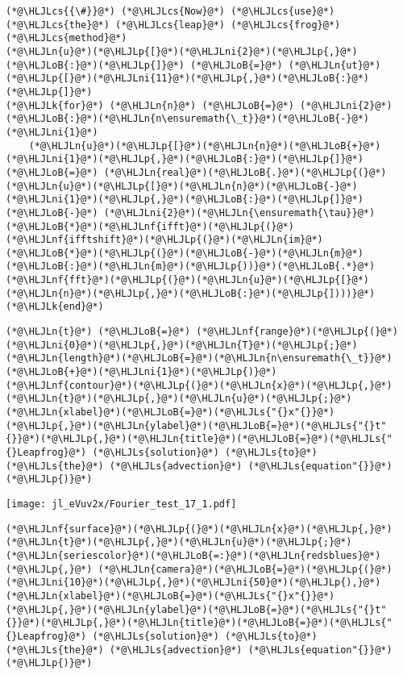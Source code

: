 \documentclass[12pt,a4paper]{article}
\newcommand{\HLJLk}[1]{\textcolor[RGB]{148,91,176}{\textbf{#1}}}
\newcommand{\HLJLn}[1]{#1}
\newcommand{\HLJLnf}[1]{\textcolor[RGB]{66,102,213}{#1}}
\newcommand{\HLJLs}[1]{\textcolor[RGB]{201,61,57}{#1}}
\newcommand{\HLJLni}[1]{\textcolor[RGB]{59,151,46}{#1}}
\newcommand{\HLJLoB}[1]{\textcolor[RGB]{102,102,102}{\textbf{#1}}}
\newcommand{\HLJLp}[1]{#1}
\newcommand{\HLJLcs}[1]{\textcolor[RGB]{153,153,119}{\textit{#1}}}
\begin{document}
\begin{lstlisting}
(*@\HLJLcs{{\#}}@*) (*@\HLJLcs{Now}@*) (*@\HLJLcs{use}@*) (*@\HLJLcs{the}@*) (*@\HLJLcs{leap}@*) (*@\HLJLcs{frog}@*) (*@\HLJLcs{method}@*)
(*@\HLJLn{u}@*)(*@\HLJLp{[}@*)(*@\HLJLni{2}@*)(*@\HLJLp{,}@*)(*@\HLJLoB{:}@*)(*@\HLJLp{]}@*) (*@\HLJLoB{=}@*) (*@\HLJLn{ut}@*)(*@\HLJLp{[}@*)(*@\HLJLni{11}@*)(*@\HLJLp{,}@*)(*@\HLJLoB{:}@*)(*@\HLJLp{]}@*)
(*@\HLJLk{for}@*) (*@\HLJLn{n}@*) (*@\HLJLoB{=}@*) (*@\HLJLni{2}@*)(*@\HLJLoB{:}@*)(*@\HLJLn{n\ensuremath{\_t}}@*)(*@\HLJLoB{-}@*)(*@\HLJLni{1}@*)
    (*@\HLJLn{u}@*)(*@\HLJLp{[}@*)(*@\HLJLn{n}@*)(*@\HLJLoB{+}@*)(*@\HLJLni{1}@*)(*@\HLJLp{,}@*)(*@\HLJLoB{:}@*)(*@\HLJLp{]}@*) (*@\HLJLoB{=}@*) (*@\HLJLn{real}@*)(*@\HLJLoB{.}@*)(*@\HLJLp{(}@*)(*@\HLJLn{u}@*)(*@\HLJLp{[}@*)(*@\HLJLn{n}@*)(*@\HLJLoB{-}@*)(*@\HLJLni{1}@*)(*@\HLJLp{,}@*)(*@\HLJLoB{:}@*)(*@\HLJLp{]}@*) (*@\HLJLoB{-}@*) (*@\HLJLni{2}@*)(*@\HLJLn{\ensuremath{\tau}}@*)(*@\HLJLoB{*}@*)(*@\HLJLnf{ifft}@*)(*@\HLJLp{(}@*)(*@\HLJLnf{ifftshift}@*)(*@\HLJLp{(}@*)(*@\HLJLn{im}@*)(*@\HLJLoB{*}@*)(*@\HLJLp{(}@*)(*@\HLJLoB{-}@*)(*@\HLJLn{m}@*)(*@\HLJLoB{:}@*)(*@\HLJLn{m}@*)(*@\HLJLp{))}@*)(*@\HLJLoB{.*}@*)(*@\HLJLnf{fft}@*)(*@\HLJLp{(}@*)(*@\HLJLn{u}@*)(*@\HLJLp{[}@*)(*@\HLJLn{n}@*)(*@\HLJLp{,}@*)(*@\HLJLoB{:}@*)(*@\HLJLp{])))}@*)
(*@\HLJLk{end}@*)
\end{lstlisting}


\begin{lstlisting}
(*@\HLJLn{t}@*) (*@\HLJLoB{=}@*) (*@\HLJLnf{range}@*)(*@\HLJLp{(}@*)(*@\HLJLni{0}@*)(*@\HLJLp{,}@*)(*@\HLJLn{T}@*)(*@\HLJLp{;}@*)(*@\HLJLn{length}@*)(*@\HLJLoB{=}@*)(*@\HLJLn{n\ensuremath{\_t}}@*)(*@\HLJLoB{+}@*)(*@\HLJLni{1}@*)(*@\HLJLp{)}@*)
(*@\HLJLnf{contour}@*)(*@\HLJLp{(}@*)(*@\HLJLn{x}@*)(*@\HLJLp{,}@*)(*@\HLJLn{t}@*)(*@\HLJLp{,}@*)(*@\HLJLn{u}@*)(*@\HLJLp{;}@*)(*@\HLJLn{xlabel}@*)(*@\HLJLoB{=}@*)(*@\HLJLs{"{}x"{}}@*)(*@\HLJLp{,}@*)(*@\HLJLn{ylabel}@*)(*@\HLJLoB{=}@*)(*@\HLJLs{"{}t"{}}@*)(*@\HLJLp{,}@*)(*@\HLJLn{title}@*)(*@\HLJLoB{=}@*)(*@\HLJLs{"{}Leapfrog}@*) (*@\HLJLs{solution}@*) (*@\HLJLs{to}@*) (*@\HLJLs{the}@*) (*@\HLJLs{advection}@*) (*@\HLJLs{equation"{}}@*)(*@\HLJLp{)}@*)
\end{lstlisting}

\texttt{[image: jl\_eVuv2x/Fourier\_test\_17\_1.pdf]}

\begin{lstlisting}
(*@\HLJLnf{surface}@*)(*@\HLJLp{(}@*)(*@\HLJLn{x}@*)(*@\HLJLp{,}@*)(*@\HLJLn{t}@*)(*@\HLJLp{,}@*)(*@\HLJLn{u}@*)(*@\HLJLp{;}@*)(*@\HLJLn{seriescolor}@*)(*@\HLJLoB{=:}@*)(*@\HLJLn{redsblues}@*)(*@\HLJLp{,}@*) (*@\HLJLn{camera}@*)(*@\HLJLoB{=}@*)(*@\HLJLp{(}@*)(*@\HLJLni{10}@*)(*@\HLJLp{,}@*)(*@\HLJLni{50}@*)(*@\HLJLp{),}@*)
(*@\HLJLn{xlabel}@*)(*@\HLJLoB{=}@*)(*@\HLJLs{"{}x"{}}@*)(*@\HLJLp{,}@*)(*@\HLJLn{ylabel}@*)(*@\HLJLoB{=}@*)(*@\HLJLs{"{}t"{}}@*)(*@\HLJLp{,}@*)(*@\HLJLn{title}@*)(*@\HLJLoB{=}@*)(*@\HLJLs{"{}Leapfrog}@*) (*@\HLJLs{solution}@*) (*@\HLJLs{to}@*) (*@\HLJLs{the}@*) (*@\HLJLs{advection}@*) (*@\HLJLs{equation"{}}@*)(*@\HLJLp{)}@*)
\end{lstlisting}
\end{document}
